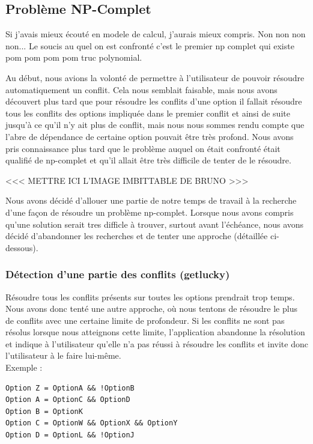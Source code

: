 \documentclass[16pts]{report}
\begin{document}
        \subsection{Problème NP-Complet}
        \label{sub:Problème NP-Complet}

Si j'avais mieux écouté en modele de calcul, j'aurais mieux compris. Non non 
non non... Le soucis au quel on est confronté c'est le premier np complet 
qui existe pom pom pom pom truc polynomial.

Au début, nous avions la volonté de permettre à l'utilisateur de pouvoir
résoudre automatiquement un conflit. Cela nous semblait faisable, mais 
nous avons découvert plus tard que pour résoudre les conflits d'une option
il fallait résoudre tous les conflits des options impliquée dans le premier
conflit et ainsi de suite jusqu'à ce qu'il n'y ait plus de conflit, mais nous 
nous sommes rendu compte que l'abre de dépendance de certaine option pouvait être 
très profond. Nous avons pris connaissance plus tard que le problème auquel on 
était confronté était qualifié de np-complet et qu'il allait être très difficile
de tenter de le résoudre. 

<<< METTRE ICI L'IMAGE IMBITTABLE DE BRUNO >>>

Nous avons décidé d'allouer une partie de notre temps de travail à la recherche
d'une façon de résoudre un problème np-complet. Lorsque nous avons compris 
qu'une solution serait tres difficle à trouver, surtout avant l'échéance, nous
avons décidé d'abandonner les recherches et de tenter une approche (détaillée
ci-dessous).


        \subsubsection{Détection d'une partie des conflits (getlucky)}
            \label{sub:Problème NP-Complet (getlucky)}

Résoudre tous les conflits présents sur toutes les options prendrait trop temps.
Nous avons donc tenté une autre approche, où nous tentons de résoudre le plus 
de conflits avec une certaine limite de profondeur. Si les conflits ne sont pas
résolus lorsque nous atteignons cette limite, l'application abandonne la 
résolution et indique à l'utilisateur qu'elle n'a pas réussi à résoudre les 
conflits et invite donc l'utilisateur à le faire lui-même.\\

Exemple :\\
\begin{lstlisting}
Option Z = OptionA && !OptionB
Option A = OptionC && OptionD
Option B = OptionK
Option C = OptionW && OptionX && OptionY
Option D = OptionL && !OptionJ
\end{lstlisting}
\end{document}
